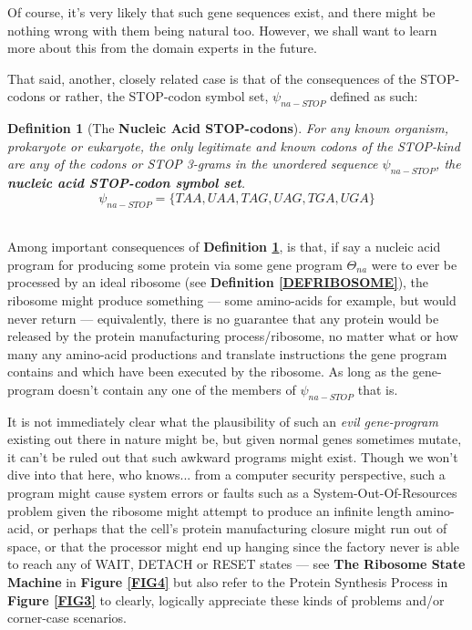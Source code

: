 \documentclass[a4paper, 18pt]{book} %
\newtheorem{defn}{Definition}
\begin{document}
Of course, it's very likely that such gene sequences exist, and there might be nothing wrong with them being natural too. However, we shall want to learn more about this from the domain experts in the future.

That said, another, closely related case is that of the consequences of the STOP-codons or rather, the STOP-codon symbol set, $\psi_{na-STOP}$ defined as such:


\begin{defn}[The \textbf{Nucleic Acid STOP-codons}]
\label{DEFSTOPCOD}
For any known organism, prokaryote or eukaryote, the only legitimate and known codons of the STOP-kind are any of the codons or STOP 3-grams in the unordered sequence $\psi_{na-STOP}$, the \textbf{nucleic acid STOP-codon symbol set}.\\

\begin{equation}
\label{EQNNASSSTOP}
\psi_{na-STOP} = \{TAA,UAA,TAG,UAG,TGA,UGA\}
\end{equation}\\
\end{defn} 

Among important consequences of \textbf{Definition \ref{DEFSTOPCOD}}, is that, if say a nucleic acid program for producing some protein via some gene program $\Theta_{na}$ were to ever be processed by an ideal ribosome (see \textbf{Definition \ref{DEFRIBOSOME}}), the ribosome might produce something --- some amino-acids for example, but would never return --- equivalently, there is no guarantee that any protein would be released by the protein manufacturing process/ribosome, no matter what or how many any amino-acid productions and translate instructions the gene program contains and which have been executed by the ribosome. As long as the gene-program doesn't contain any one of the members of $\psi_{na-STOP}$ that is.

It is not immediately clear what the plausibility of such an \textit{evil gene-program} existing out there in nature might be, but given normal genes sometimes mutate\cite{gregory1987oxford}, it can't be ruled out that such awkward programs might exist. Though we won't dive into that here, who knows... from a computer security perspective, such a program might cause system errors or faults such as a System-Out-Of-Resources problem given the ribosome might attempt to produce an infinite length amino-acid, or perhaps that the cell's protein manufacturing closure might run out of space, or that the processor might end up hanging since the factory never is able to reach any of WAIT, DETACH or RESET states --- see \textbf{The Ribosome State Machine} in \textbf{Figure \ref{FIG4}} but also refer to the Protein Synthesis Process in \textbf{Figure \ref{FIG3}} to clearly, logically appreciate these kinds of problems and/or corner-case scenarios. 
\end{document}
